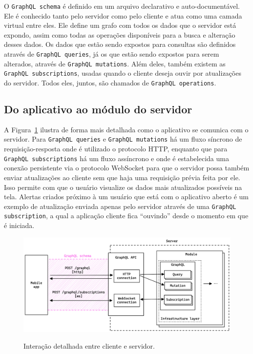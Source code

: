O \texttt{GraphQL schema} é definido em um arquivo declarativo e auto-documentável. Ele é conhecido tanto pelo servidor como pelo cliente e atua como uma camada virtual entre eles. Ele define um grafo com todos os dados que o servidor está expondo, assim como todas as operações disponíveis para a busca e alteração desses dados. Os dados que estão sendo expostos para consultas são definidos através de \texttt{GraphQL queries}, já os que estão sendo expostos para serem alterados, através de \texttt{GraphQL mutations}. Além deles, também existem as \texttt{GraphQL subscriptions}, usadas quando o cliente deseja ouvir por atualizações do servidor. Todos eles, juntos, são chamados de \texttt{GraphQL operations}.

\subsection{Do aplicativo ao módulo do servidor}

A Figura~\ref{f.system_server_api} ilustra de forma mais detalhada como o aplicativo se comunica com o servidor. Para \texttt{GraphQL queries} e \texttt{GraphQL mutations} há um fluxo síncrono de requisição-resposta onde é utilizado o protocolo HTTP, enquanto que para \texttt{GraphQL subscriptions} há um fluxo assíncrono e onde é estabelecida uma conexão persistente via o protocolo WebSocket para que o servidor possa também enviar atualizações ao cliente sem que haja uma requisição prévia feita por ele. Isso permite com que o usuário visualize os dados mais atualizados possíveis na tela. Alertas criados próximo à um usuário que está com o aplicativo aberto é um exemplo de atualização enviada apenas pelo servidor através de uma \texttt{GraphQL subscription}, a qual a aplicação cliente fica ``ouvindo'' desde o momento em que é iniciada.

\begin{figure}[htbp]
	\caption{\small Interação detalhada entre cliente e servidor.}
	\centering
	\includegraphics[width=\textwidth]{../diagrams/out/system_server_api.png}
	\label{f.system_server_api}
\end{figure}


